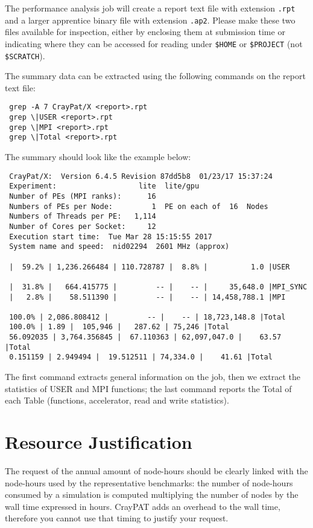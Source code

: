 \documentclass[11pt]{article}
\begin{document}
The performance analysis job will create a report text file with extension \verb!.rpt! 
and a larger apprentice binary file with extension \verb!.ap2!. 
Please make these two files available for inspection, either by enclosing them at submission time or 
indicating where they can be accessed for reading under \verb!$HOME! or \verb!$PROJECT! (not \verb!$SCRATCH!).  

The summary data can be extracted using the following commands on the report text file:
\begin{verbatim}
 grep -A 7 CrayPat/X <report>.rpt
 grep \|USER <report>.rpt
 grep \|MPI <report>.rpt
 grep \|Total <report>.rpt
\end{verbatim}

The summary should look like the example below:
\begin{verbatim}
 CrayPat/X:  Version 6.4.5 Revision 87dd5b8  01/23/17 15:37:24
 Experiment:                   lite  lite/gpu     
 Number of PEs (MPI ranks):      16
 Numbers of PEs per Node:         1  PE on each of  16  Nodes
 Numbers of Threads per PE:   1,114
 Number of Cores per Socket:     12
 Execution start time:  Tue Mar 28 15:15:55 2017
 System name and speed:  nid02294  2601 MHz (approx)

 |  59.2% | 1,236.266484 | 110.728787 |  8.8% |          1.0 |USER

 |  31.8% |   664.415775 |         -- |    -- |     35,648.0 |MPI_SYNC
 |   2.8% |    58.511390 |         -- |    -- | 14,458,788.1 |MPI

 100.0% | 2,086.808412 |         -- |    -- | 18,723,148.8 |Total
 100.0% | 1.89 |  105,946 |   287.62 | 75,246 |Total
 56.092035 | 3,764.356845 |  67.110363 | 62,097,047.0 |    63.57 |Total
 0.151159 | 2.949494 |  19.512511 | 74,334.0 |    41.61 |Total
\end{verbatim}

The first command extracts general information on the job, then we extract the statistics of USER and MPI functions; 
the last command reports the Total of each Table (functions, accelerator, read and write statistics).

\section{Resource Justification}
The request of the annual amount of node-hours should be clearly linked with the node-hours used 
by the representative benchmarks: the number of node-hours consumed by a simulation is computed 
multiplying the number of nodes by the wall time expressed in hours. 
CrayPAT adds an overhead to the wall time, therefore you cannot use that timing to justify your request.
\end{document}
